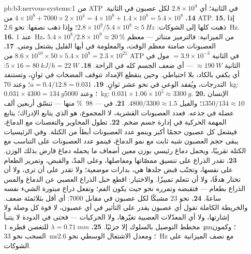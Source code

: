 \begin{solution}{pb:b3:nervous-systems:1}
من ATP في الثانية؛ أي $2.8\times 10^{9}$ لكل عصبون في الثانية.
\textbf{14.} $4\times 10^{8} + 7000\times 2\times 10^{4} = 4\times 10^{8}
+ 1.4\times 10^{8} = 5.4\times 10^{8}$ من ATP.
\textbf{15.} إذا ذهبت كلها إلى الشوكات: $2.8\times 10^{9}/5.4\times 10^{8} \approx
\qty{5}{Hz}$؛ وإذا ذهب نصفها: نحو \qty{2.6}{Hz}.
\textbf{16.} عند \qty{1}{Hz}، $5.4\times 10^{8}/2.8\times 10^{9} \approx
\qty{20}{\%}$ من الميزانية: فالترميز متناثر --- معظم
العصبونات صامتة معظم الوقت، والمعلومة في أيها القليل يشتعل
ومتى.
\textbf{17.} $8.6\times 10^{10}\times 50\times 5.4\times 10^{8} = 2.3
\times 10^{21}$ من ATP في الثانية $= 3.9\times 10^{-3}$ مول في الثانية $\approx \qty{190}{W}$
--- أي ضعف الجسم كله في الراحة.
\textbf{18.} $5\times 16 = \qty{80}{kJ/h} = \qty{22}{W}$: أي يكفي
بالكاد، بلا احتياطي. وحين ينقطع الإمداد تتوقف المضخات في
ثوانٍ، وتستنفد التدرجات، ويُفقد الوعي في نحو عشر ثوانٍ.
\textbf{19.} $a = 0.4/12.8 = 0.031$؛ وعند \qty{70}{kg}: $0.031\times 4300 =
\qty{134}{g}$؛ وعند \qty{5000}{kg}: $0.031\times 1.06\times 10^{5} \approx
\qty{3300}{g}$.
\textbf{20.} الإنسان $1350/134 \approx 10$؛ والفيل $4800/3300 \approx
1.5$.
\textbf{21.} في  --- \qty{98}{\%} منها --- تنسّق أربعين
ألف عضلة في جذعه. فعدد العصبونات القشرية، لا المجموع، هو
الذي يتابع الإدراك؛  يتابع المهمة الحركية في إدارة
جسم ضخم.
\textbf{22.} تطول المحاوير والتغصنات مع الدماغ، فيشغل كل
عصبون حجمًا أكبر وينمو عدد العصبونات أبطأ من الكتلة. وفي
الرئيسيات يبقى حجم العصبون شبه ثابت مع نمو الدماغ، فينمو
عدد العصبونات على التناسب مع الكتلة تقريبًا، ويحمل دماغ
رئيسي بوزن معين أضعاف ما يحمله دماغ قارض بذلك الوزن.
\textbf{23.} تقدر الذراع على تنسيق ممصّاتها ومفاصلها، وعلى
المدّ، والقبض، وتمرير الطعام على نفسها، وتجنّب قبض جلدها هي،
بدارات موضعية؛ ولا تقدر على أن ترى، ولا أن تختار هدفًا، ولا
أن تتعلم تمييزًا. والاختبار: اقطع حبل الذراع العصبي عن
الدماغ والمس الذراع بطعام --- فتقبضه وتمرره نحو حيث يكون
الفم؛ وتفعل ذراع مبتورة الشيء نفسه ساعةً.
\textbf{24.} نحو $23$ مشبكًا لكل عصبون في مقابل $7000$: أي أقل
بثلاثمئة ضعف. والخريطة الكاملة تقول أي عصبون يقدر على
التأثير في أي عصبون، لا قوة كل وصلة ولا إشارتها، ولا أي
المعدّلات العصبية تغيّرها، ولا الحركيات --- فحتى في الدودة
لا يتنبأ مخطط التوصيل بالسلوك إلا جزئيًا.
\textbf{25.} $\lambda = \qty{0.71}{mm}$ للتغصن قطره
\qty{1}{\micro m}؛ وكمون السحب نحو \qty{33}{ms}؛ ومعدل
الاشتعال الوسطي نحو \qty{2.6}{Hz} مع نصف الميزانية على
الشوكات.
\end{solution}
